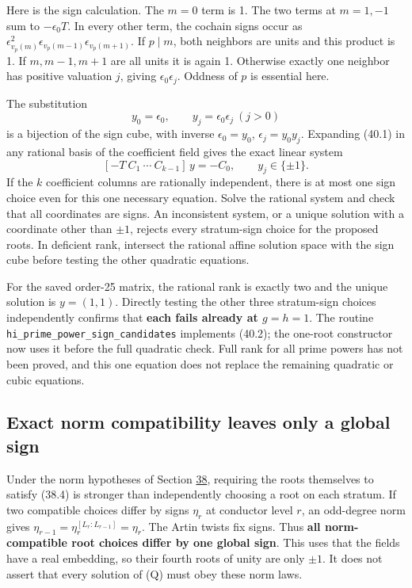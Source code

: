 \documentclass[11pt,reqno]{amsart}
\theoremstyle{plain}
\begin{document}
Here is the sign calculation. The \(m=0\) term is 1. The two
terms at \(m=1,-1\) sum to \(-\epsilon_0T\). In every other
term, the cochain signs occur as
\(\epsilon_{v_p(m)}^2
\epsilon_{v_p(m-1)}\epsilon_{v_p(m+1)}\).
If \(p\mid m\), both neighbors are units and this product is 1.
If \(m,m-1,m+1\) are all units it is again 1. Otherwise exactly
one neighbor has positive valuation \(j\), giving
\(\epsilon_0\epsilon_j\). Oddness of \(p\) is essential here.

The substitution
\[
 y_0=\epsilon_0,\qquad y_j=\epsilon_0\epsilon_j\ (j>0)
\]
is a bijection of the sign cube, with inverse
\(\epsilon_0=y_0\), \(\epsilon_j=y_0y_j\). Expanding (40.1)
in any rational basis of the coefficient field gives the exact
linear system
\begin{equation*}
 \boxed{\quad [-T\ C_1\ \cdots\ C_{k-1}]\,y=-C_0,
           \qquad y_j\in\{\pm1\}.\quad} \tag{40.2}
\end{equation*}
If the \(k\) coefficient columns are rationally independent,
there is at most one sign choice even for this one necessary
equation. Solve the rational system and check that all coordinates
are signs. An inconsistent system, or a unique solution with a
coordinate other than \(\pm1\), rejects every stratum-sign choice
for the proposed roots. In deficient rank, intersect the rational
affine solution space with the sign cube before testing the other
quadratic equations.

For the saved order-25 matrix, the rational rank is exactly two and
the unique solution is \(y=(1,1)\). Directly testing the other
three stratum-sign choices independently confirms that \textbf{each fails
already at \(g=h=1\)}. The routine
\texttt{hi\_\allowbreak prime\_\allowbreak power\_\allowbreak sign\_\allowbreak candidates} implements (40.2); the one-root
constructor now uses it before the full quadratic check. Full rank
for all prime powers has not been proved, and this one equation
does not replace the remaining quadratic or cubic equations.

\subsection{Exact norm compatibility leaves only a global sign}\label{sec:40.2}

Under the norm hypotheses of Section \hyperref[sec:38]{38}, requiring the roots
themselves to satisfy (38.4) is stronger than independently choosing
a root on each stratum. If two compatible choices differ by signs
\(\eta_r\) at conductor level \(r\), an odd-degree norm gives
\(\eta_{r-1}=\eta_r^{[L_r:L_{r-1}]}=\eta_r\).
The Artin twists fix signs. Thus \textbf{all norm-compatible root choices
differ by one global sign}. This uses that the fields have a real
embedding, so their fourth roots of unity are only \(\pm1\).
It does not assert that every solution of (Q) must obey these norm laws.
\end{document}

